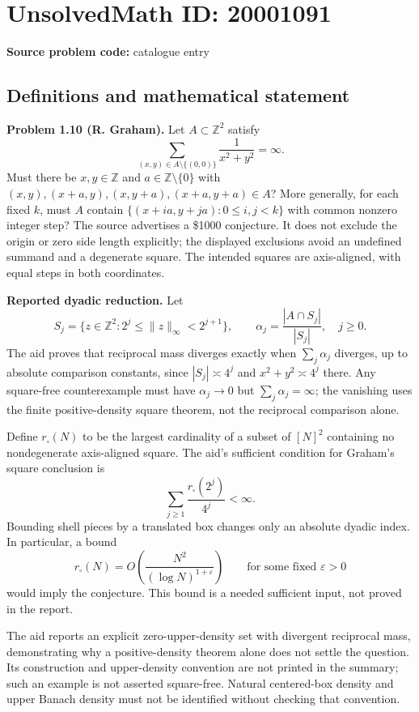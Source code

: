\documentclass[11pt]{article}
\newcommand{\Z}{\mathbb{Z}}
\begin{document}
\section*{UnsolvedMath ID: 20001091}
\textbf{Source problem code:} catalogue entry
\subsection{Definitions and mathematical statement}
\textbf{Problem 1.10 (R. Graham).} Let $A\subset\Z^2$ satisfy
\[
 \sum_{(x,y)\in A\setminus\{(0,0)\}}\frac1{x^2+y^2}=\infty.
\]
Must there be $x,y\in\Z$ and $a\in\Z\setminus\{0\}$ with $(x,y),(x+a,y),(x,y+a),(x+a,y+a)\in A$? More generally, for each fixed $k$, must $A$ contain $\{(x+ia,y+ja):0\leq i,j<k\}$ with common nonzero integer step? The source advertises a \$1000 conjecture. It does not exclude the origin or zero side length explicitly; the displayed exclusions avoid an undefined summand and a degenerate square. The intended squares are axis-aligned, with equal steps in both coordinates.

\textbf{Reported dyadic reduction.} Let
\[
 S_j=\{z\in\Z^2:2^j\leq\|z\|_\infty<2^{j+1}\},\qquad
 \alpha_j=\frac{|A\cap S_j|}{|S_j|},\quad j\geq0.
\]
The aid proves that reciprocal mass diverges exactly when $\sum_j\alpha_j$ diverges, up to absolute comparison constants, since $|S_j|\asymp4^j$ and $x^2+y^2\asymp4^j$ there. Any square-free counterexample must have $\alpha_j\to0$ but $\sum_j\alpha_j=\infty$; the vanishing uses the finite positive-density square theorem, not the reciprocal comparison alone.

Define $r_\square(N)$ to be the largest cardinality of a subset of $[N]^2$ containing no nondegenerate axis-aligned square. The aid's sufficient condition for Graham's square conclusion is
\[
 \sum_{j\geq1}\frac{r_\square(2^j)}{4^j}<\infty.
\]
Bounding shell pieces by a translated box changes only an absolute dyadic index. In particular, a bound
\[
 r_\square(N)=O\!\left(\frac{N^2}{(\log N)^{1+\varepsilon}}\right)
 \qquad\text{for some fixed }\varepsilon>0
\]
would imply the conjecture. This bound is a needed sufficient input, not proved in the report.

The aid reports an explicit zero-upper-density set with divergent reciprocal mass, demonstrating why a positive-density theorem alone does not settle the question. Its construction and upper-density convention are not printed in the summary; such an example is not asserted square-free. Natural centered-box density and upper Banach density must not be identified without checking that convention.
\end{document}
